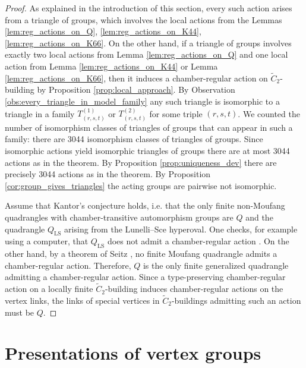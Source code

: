 \documentclass[dvipsnames]{article}
\theoremstyle{definition}
\theoremstyle{remark}
\DeclareMathOperator{\LS}{LS}
\begin{document}
    \begin{proof}
        As explained in the introduction of this section, every such action arises from a triangle of groups, which involves the local actions from the Lemmas \ref{lem:reg_actions_on_Q}, \ref{lem:reg_actions_on_K44}, \ref{lem:reg_actions_on_K66}.
        On the other hand, if a triangle of groups involves exactly two local actions from Lemma \ref{lem:reg_actions_on_Q} and one local action from Lemma \ref{lem:reg_actions_on_K44} or Lemma \ref{lem:reg_actions_on_K66}, then it induces a chamber-regular action on $\tilde C_2$-building by Proposition \ref{prop:local_approach}.
        By Observation \ref{obs:every_triangle_in_model_family} any such triangle is isomorphic to a triangle in a family $T_{(r,s,t)}^{(1)}$ or $T_{(r,s,t)}^{(2)}$ for some triple $(r,s,t)$.
        We counted the number of isomorphism classes of triangles of groups that can appear in such a family: there are 3044 isomorphism classes of triangles of groups.
        Since isomorphic actions yield isomorphic triangles of groups there are at most 3044 actions as in the theorem. By Proposition \ref{prop:uniqueness_dev} there are precisely 3044 actions as in the theorem.
        By Proposition \ref{cor:group_gives_triangles} the acting groups are pairwise not isomorphic.
        
        Assume that Kantor's conjecture holds, i.e. that the only finite non-Moufang quadrangles with chamber-transitive automorphism groups are $Q$ and the quadrangle $Q_{\LS}$ arising from the Lunelli--Sce hyperoval. One checks, for example using a computer, that $Q_{\LS}$ does not admit a chamber-regular action \cite{ChamberRegularCode}. On the other hand, by a theorem of Seitz \cite[Theorem 4.8.7]{VanMaldeghem}, no finite Moufang quadrangle admits a chamber-regular action. Therefore, $Q$ is the only finite generalized quadrangle admitting a chamber-regular action. Since a type-preserving chamber-regular action on a locally finite $\tilde C_2$-building induces chamber-regular actions on the vertex links, the links of special vertices in $\tilde C_2$-buildings admitting such an action must be $Q$.
    \end{proof}

    \appendix
    \section{Presentations of vertex groups}\label{app:presentations}
\end{document}
